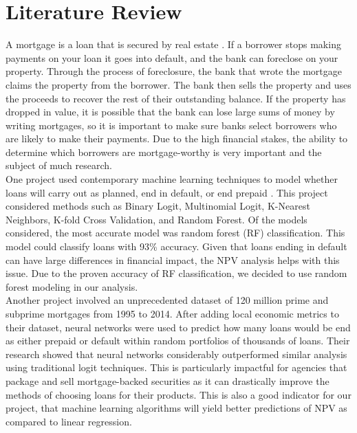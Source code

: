 \documentclass[12 pt]{uncw_thesis}
\theoremstyle{plain}
\theoremstyle{remark}
\theoremstyle{definition}
\begin{document}
\section{Literature Review}
A mortgage is a loan that is secured by real estate \cite{Fannie}. If a borrower stops making payments on your loan it goes into default, and the bank can foreclose on your property. Through the process of foreclosure, the bank  that  wrote the mortgage claims the property from the borrower. The bank then sells the property and uses the proceeds to recover the rest of their outstanding balance. If the property has dropped in value, it is possible that the bank can lose large sums of money by writing mortgages, so it is important to make sure banks select borrowers who are likely to make their payments. Due to the high financial stakes, the ability to determine which borrowers are mortgage-worthy is very important and the subject of much research.\\
One project used contemporary machine learning techniques to model whether loans will carry out as planned, end in default, or end prepaid \cite{Deng}. This project considered methods such as Binary Logit, Multinomial Logit, K-Nearest Neighbors, K-fold Cross Validation, and Random Forest. Of the models considered, the most accurate model was random forest (RF) classification. This model could classify loans with 93\% accuracy. Given that loans ending in default can have large differences in financial impact, the NPV analysis helps with this issue. Due to the proven accuracy of RF classification, we decided to use random forest modeling in our analysis. \\ 
Another project involved an unprecedented dataset of 120 million prime and subprime mortgages from 1995 to 2014\cite{Sirignano}. After adding local economic metrics to their dataset, neural networks were used to predict how many loans would be end as either prepaid or default within random portfolios of thousands of loans. Their research showed that neural networks considerably outperformed similar analysis using traditional logit techniques. This is particularly impactful for agencies that package and sell mortgage-backed securities as it can drastically improve the methods of choosing loans for their products. This is also a good indicator for our project, that machine learning algorithms will yield better predictions of NPV as compared to linear regression.
\end{document}
